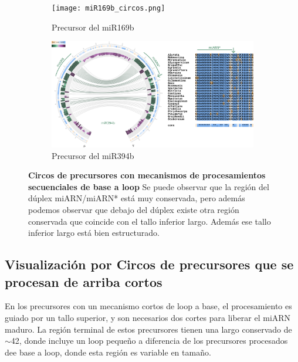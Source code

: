 \begin{landscape}
	\begin{figure}
	\centering
	\begin{subfigure}{.75\textwidth}
 \centering
 \texttt{[image: miR169b\_circos.png]}
 \caption{Precursor del miR169b}
 \label{subfig:miR169b_circos}
	\end{subfigure}%
	\begin{subfigure}{.75\textwidth}
 \centering
 \includegraphics[width=.9\linewidth]{miR394b_circos.png}
 \caption{Precursor del miR394b}
 \label{subfig:miR394b_circos}
	\end{subfigure}
    \caption[Circos de precursores con mecanismos de procesamientos secuenciales de base a loop]{
        \textbf{Circos de precursores con mecanismos de procesamientos secuenciales de base a loop}
        Se puede observar que la región del dúplex miARN/miARN* está muy conservada, pero además podemos observar que debajo del dúplex existe otra región conservada que coincide con el tallo inferior largo.
        Además ese tallo inferior largo está bien estructurado.
        }

	\label{fig:seqBTL_circos}
	\end{figure}
\end{landscape}


\subsection{Visualización por Circos de precursores que se procesan de arriba cortos}

En los precursores con un mecanismo cortos de loop a base, el procesamiento es guiado por un tallo superior, y son necesarios dos cortes para liberar el miARN maduro.
La región terminal de estos precursores tienen una largo conservado de $\sim$42, donde incluye un loop pequeño \citep{Bologna2013} a diferencia de los precursores procesados dee base a loop, donde esta región es variable en tamaño.

